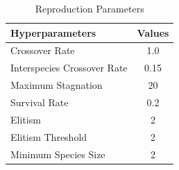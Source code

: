 \documentclass[letterpaper, 12pt]{article}
\begin{document}
\begin{table}[H]
\centering
\caption{Reproduction Parameters}
\begin{NiceTabular}{X|c}
\toprule
\textbf{Hyperparameters} & \textbf{Values} \\
\midrule
Crossover Rate & 1.0 \\
Interspecies Crossover Rate & 0.15 \\
Maximum Stagnation & 20 \\
Survival Rate & 0.2 \\
Elitism & 2 \\
Elitism Threshold & 2 \\
Minimum Species Size & 2 \\
\bottomrule
\end{NiceTabular}
\end{table}



\end{document}
